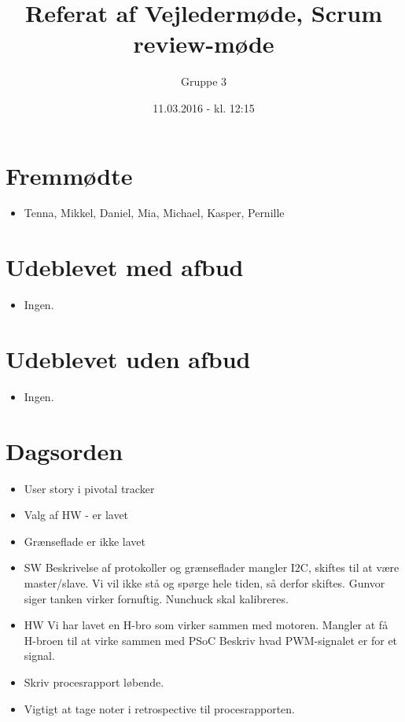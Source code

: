 \documentclass{article}
\title{Referat af Vejledermøde, Scrum review-møde }
\author{Gruppe 3}
\date{11.03.2016 - kl. 12:15}
\begin{document}
	\maketitle
	
	\section{Fremmødte}
	\begin{itemize}
		\item Tenna, Mikkel, Daniel, Mia, Michael, Kasper, Pernille
	\end{itemize}
	
	\section{Udeblevet med afbud}
	\begin{itemize}
		\item Ingen. 
	\end{itemize}
	
	\section{Udeblevet uden afbud}
	\begin{itemize}
		\item Ingen. 
	\end{itemize}
	
	\section{Dagsorden}
	\begin{itemize}
		\item User story i pivotal tracker
		\item Valg af HW - er lavet 
		\item Grænseflade er ikke lavet
		\item SW
		\subitem Beskrivelse af protokoller og grænseflader mangler
		\subitem I2C, skiftes til at være master/slave.
		\subitem Vi vil ikke stå og spørge hele tiden, så derfor skiftes. Gunvor siger tanken virker fornuftig. 
		\subitem Nunchuck skal kalibreres. 
		\item HW
		\subitem Vi har lavet en H-bro som virker sammen med motoren. 
		\subitem Mangler at få H-broen til at virke sammen med PSoC
		\subitem Beskriv hvad PWM-signalet er for et signal. 
		\item Skriv procesrapport løbende.
		\item Vigtigt at tage noter i retrospective til procesrapporten. 
		

	\end{itemize}
\end{document}
